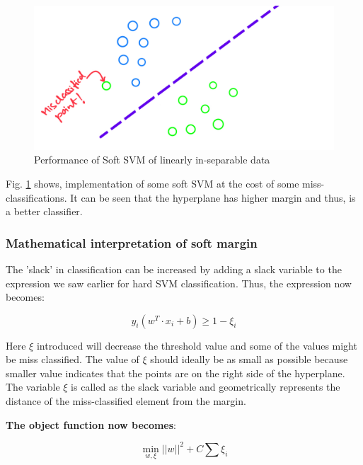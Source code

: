 \documentclass[11pt]{article}
\begin{document}
\begin{figure}[H]
\begin{center}
\includegraphics[scale=0.25]{figures/MissClassify.PNG}
\end{center}
\caption{Performance of Soft SVM of linearly in-separable data}
\label{fig:LinearlySeperable}
\end{figure}

Fig. \ref{fig:LinearlySeperable} shows, implementation of some soft SVM at the cost of some miss-classifications. It can be seen that the hyperplane has higher margin and thus, is a better classifier.

\subsubsection{Mathematical interpretation of soft margin}

The 'slack' in classification can be increased by adding a slack variable to the expression we saw earlier for hard SVM classification. Thus, the expression now becomes:

\begin{equation}
y_i(w^T \cdot x_i+b) \geq 1- \xi_i
\end{equation}

Here $\xi$ introduced will decrease the threshold value and some of the values might be miss classified. The value of $\xi$ should ideally be as small as possible because smaller value indicates that the points are on the right side of the hyperplane. The variable $\xi$ is called as the slack variable and geometrically represents the distance of the miss-classified element from the margin. 

\textbf{The object function now becomes}:

\begin{equation}
\min_{w,\xi}||w||^{2} + C \sum{\xi_i}
\end{equation}
\end{document}
